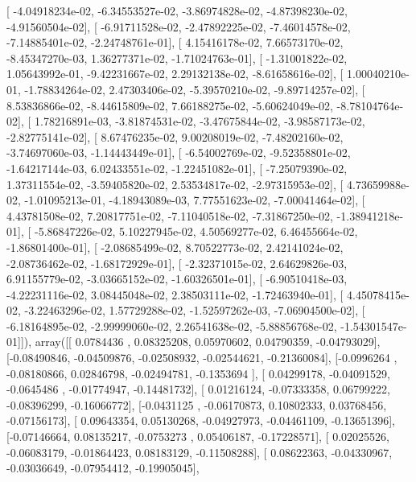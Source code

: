 \documentclass{article}
\begin{document}
       [ -4.04918234e-02,  -6.34553527e-02,  -3.86974828e-02,
         -4.87398230e-02,  -4.91560504e-02],
       [ -6.91711528e-02,  -2.47892225e-02,  -7.46014578e-02,
         -7.14885401e-02,  -2.24748761e-01],
       [  4.15416178e-02,   7.66573170e-02,  -8.45347270e-03,
          1.36277371e-02,  -1.71024763e-01],
       [ -1.31001822e-02,   1.05643992e-01,  -9.42231667e-02,
          2.29132138e-02,  -8.61658616e-02],
       [  1.00040210e-01,  -1.78834264e-02,   2.47303406e-02,
         -5.39570210e-02,  -9.89714257e-02],
       [  8.53836866e-02,  -8.44615809e-02,   7.66188275e-02,
         -5.60624049e-02,  -8.78104764e-02],
       [  1.78216891e-03,  -3.81874531e-02,  -3.47675844e-02,
         -3.98587173e-02,  -2.82775141e-02],
       [  8.67476235e-02,   9.00208019e-02,  -7.48202160e-02,
         -3.74697060e-03,  -1.14443449e-01],
       [ -6.54002769e-02,  -9.52358801e-02,  -1.64217144e-03,
          6.02433551e-02,  -1.22451082e-01],
       [ -7.25079390e-02,   1.37311554e-02,  -3.59405820e-02,
          2.53534817e-02,  -2.97315953e-02],
       [  4.73659988e-02,  -1.01095213e-01,  -4.18943089e-03,
          7.77551623e-02,  -7.00041464e-02],
       [  4.43781508e-02,   7.20817751e-02,  -7.11040518e-02,
         -7.31867250e-02,  -1.38941218e-01],
       [ -5.86847226e-02,   5.10227945e-02,   4.50569277e-02,
          6.46455664e-02,  -1.86801400e-01],
       [ -2.08685499e-02,   8.70522773e-02,   2.42141024e-02,
         -2.08736462e-02,  -1.68172929e-01],
       [ -2.32371015e-02,   2.64629826e-03,   6.91155779e-02,
         -3.03665152e-02,  -1.60326501e-01],
       [ -6.90510418e-03,  -4.22231116e-02,   3.08445048e-02,
          2.38503111e-02,  -1.72463940e-01],
       [  4.45078415e-02,  -3.22463296e-02,   1.57729288e-02,
         -1.52597262e-03,  -7.06904500e-02],
       [ -6.18164895e-02,  -2.99999060e-02,   2.26541638e-02,
         -5.88856768e-02,  -1.54301547e-01]]), array([[ 0.0784436 ,  0.08325208,  0.05970602,  0.04790359, -0.04793029],
       [-0.08490846, -0.04509876, -0.02508932, -0.02544621, -0.21360084],
       [-0.0996264 , -0.08180866,  0.02846798, -0.02494781, -0.1353694 ],
       [ 0.04299178, -0.04091529, -0.0645486 , -0.01774947, -0.14481732],
       [ 0.01216124, -0.07333358,  0.06799222, -0.08396299, -0.16066772],
       [-0.0431125 , -0.06170873,  0.10802333,  0.03768456, -0.07156173],
       [ 0.09643354,  0.05130268, -0.04927973, -0.04461109, -0.13651396],
       [-0.07146664,  0.08135217, -0.0753273 ,  0.05406187, -0.17228571],
       [ 0.02025526, -0.06083179, -0.01864423,  0.08183129, -0.11508288],
       [ 0.08622363, -0.04330967, -0.03036649, -0.07954412, -0.19905045],
\end{document}
